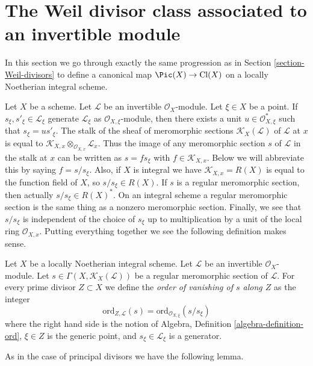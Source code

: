 \section{The Weil divisor class associated to an invertible module}
\label{section-c1}

\noindent
In this section we go through exactly the same progression as in
Section \ref{section-Weil-divisors} to define a canonical map
$\Pic(X) \to \text{Cl}(X)$
on a locally Noetherian integral scheme.

\medskip\noindent
Let $X$ be a scheme. Let $\mathcal{L}$ be an invertible $\mathcal{O}_X$-module.
Let $\xi \in X$ be a point. If $s_\xi, s'_\xi \in \mathcal{L}_\xi$ generate
$\mathcal{L}_\xi$ as $\mathcal{O}_{X, \xi}$-module, then there exists a unit
$u \in \mathcal{O}_{X, \xi}^*$ such that $s_\xi = u s'_\xi$.
The stalk of the sheaf of meromorphic sections
$\mathcal{K}_X(\mathcal{L})$ of $\mathcal{L}$
at $x$ is equal to
$\mathcal{K}_{X, x} \otimes_{\mathcal{O}_{X, x}} \mathcal{L}_x$.
Thus the image of any meromorphic section $s$
of $\mathcal{L}$ in the stalk at $x$ can be written as $s = fs_\xi$ with
$f \in \mathcal{K}_{X, x}$. Below we will abbreviate this by
saying $f = s/s_\xi$. Also, if $X$ is integral we have
$\mathcal{K}_{X, x} = R(X)$ is equal to the function field of $X$,
so $s/s_\xi \in R(X)$. If $s$ is a regular meromorphic section,
then actually $s/s_\xi \in R(X)^*$. On an integral scheme a regular
meromorphic section is the same thing as a nonzero meromorphic section.
Finally, we see that $s/s_\xi$ is independent of the choice of $s_\xi$ up to
multiplication by a unit of the local ring $\mathcal{O}_{X, x}$.
Putting everything together we see the following definition makes sense.

\begin{definition}
\label{definition-order-vanishing-meromorphic}
Let $X$ be a locally Noetherian integral scheme.
Let $\mathcal{L}$ be an invertible $\mathcal{O}_X$-module.
Let $s \in \Gamma(X, \mathcal{K}_X(\mathcal{L}))$
be a regular meromorphic section of $\mathcal{L}$.
For every prime divisor $Z \subset X$ we define the
{\it order of vanishing of $s$ along $Z$} as the integer
$$
\text{ord}_{Z, \mathcal{L}}(s)
= \text{ord}_{\mathcal{O}_{X, \xi}}(s/s_\xi)
$$
where the right hand side is the notion of
Algebra, Definition \ref{algebra-definition-ord},
$\xi \in Z$ is the generic point,
and $s_\xi \in \mathcal{L}_\xi$ is a generator.
\end{definition}

\noindent
As in the case of principal divisors we have the following lemma.


